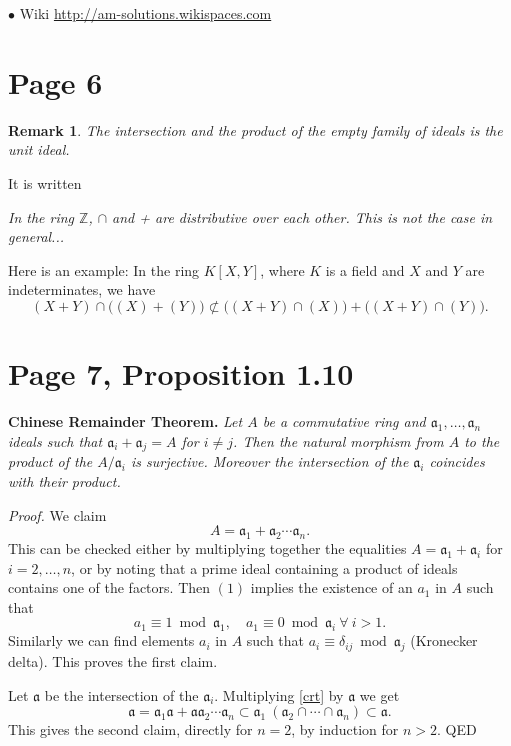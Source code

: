 \documentclass[12pt]{article}
\newcommand{\mf}{\mathfrak}
\newcommand{\aaa}{\mf a}
\newcommand{\bu}{\bullet}
\newtheorem{rk}[thm]{Remark}
\begin{document}
$\bu$ Wiki \href{http://am-solutions.wikispaces.com}{http://am-solutions.wikispaces.com}

\section{Page 6}%

\begin{rk}\label{ef}
The intersection and the product of the empty family of ideals is the unit ideal.
\end{rk}

It is written

\emph{In the ring $\mathbb Z$, $\cap$ and + are distributive over each other. This is not the case in general...}

Here is an example: In the ring $K[X,Y]$, where $K$ is a field and $X$ and $Y$ are indeterminates, we have 
$$
(X+Y)\cap\Big((X)+(Y)\Big)\not\subset\Big((X+Y)\cap (X)\Big)+\Big((X+Y)\cap (Y)\Big).
$$

\section{Page 7, Proposition 1.10}%

\textbf{Chinese Remainder Theorem.} \emph{Let $A$ be a commutative ring and $\aaa_1,\dots,\aaa_n$ ideals such that $\aaa_i+\aaa_j=A$ for $i\not=j$. Then the natural morphism from $A$ to the product of the $A/\aaa_i$ is surjective. Moreover the intersection of the $\aaa_i$ coincides with their product.}

\emph{Proof.} We claim
\begin{equation}\label{crt}
A=\aaa_1+\aaa_2\cdots\aaa_n.
\end{equation}
This can be checked either by multiplying together the equalities $A=\aaa_1+\aaa_i$ for $i=2,\dots,n$, or by noting that a prime ideal containing a product of ideals contains one of the factors. Then $(1)$ implies the existence of an $a_1$ in $A$ such that
$$
a_1\equiv1\bmod\aaa_1,\quad a_1\equiv0\bmod \aaa_i\ \forall\ i > 1.
$$
Similarly we can find elements $a_i$ in $A$ such that $a_i\equiv\delta_{ij}\bmod \aaa_j$ (Kronecker delta). This proves the first claim.

Let $\aaa$ be the intersection of the $\aaa_i$. Multiplying \eqref{crt} by $\aaa$ we get
$$
\aaa=
\aaa_1\aaa+
\aaa\aaa_2\cdots\aaa_n\subset
\aaa_1\ (\aaa_2\cap\cdots \cap \aaa_n)\subset \aaa.
$$
This gives the second claim, directly for $n=2$, by induction for $n>2$. QED
\end{document}
